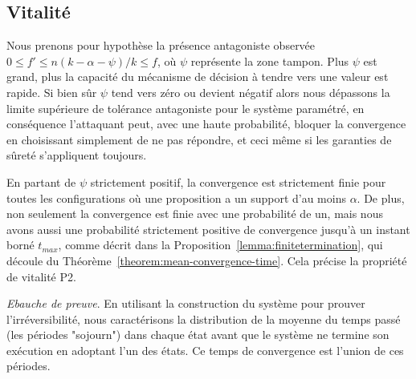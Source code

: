 \documentclass[letterpaper,twocolumn,10pt]{article}
\theoremstyle{definition}
\begin{document}

\subsection{Vitalité}

Nous prenons pour hypothèse la présence antagoniste observée $0 \leq f' \leq n(k - \alpha - \psi)/k \leq f$, où $\psi$
représente la zone tampon.
Plus $\psi$ est grand, plus la capacité du mécanisme de décision à tendre vers une valeur est rapide. Si bien sûr $\psi$
tend vers zéro ou devient négatif alors nous dépassons la limite supérieure de tolérance antagoniste pour le système
paramétré, en conséquence l'attaquant peut, avec une haute probabilité, bloquer la convergence en choisissant simplement
de ne pas répondre, et ceci même si les garanties de sûreté s'appliquent toujours.

En partant de $\psi$ strictement positif, la convergence est strictement finie pour toutes les configurations où une
proposition a un support d'au moins $\alpha$. De plus, non seulement la convergence est finie avec une probabilité de
un, mais nous avons aussi une probabilité strictement positive de convergence jusqu'à un instant borné $t_{max}$, comme
décrit dans la Proposition~\ref{lemma:finitetermination}, qui découle du Théorème~\ref{theorem:mean-convergence-time}.
Cela précise la propriété de vitalité P2.

\noindent \emph{Ebauche de preuve}. En utilisant la construction du système pour prouver l'irréversibilité, nous
caractérisons la distribution de la moyenne du temps passé (les périodes "sojourn") dans chaque état avant que le
système ne termine son exécution en adoptant l'un des états. Ce temps de convergence est l'union de ces périodes.
\end{document}
